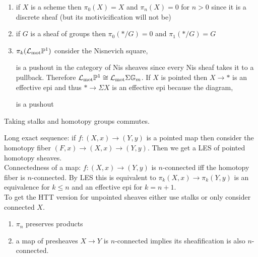 \documentclass[12pt]{article}
\begin{document}
\begin{example}
\begin{enumerate}
\item if $X$ is a scheme then $\pi_0(X) = X$ and $\pi_n(X) = 0$ for $n > 0$ since it is a discrete sheaf (but its motivicification will not be)
\item if $G$ is a sheaf of groups then $\pi_0(*/G) = 0$ and $\pi_1(*/G) = G$
\item $\pi_k(\mathcal{L}_{\text{mot}} \mathbb{P}^1)$ consider the Nisnevich square,
\begin{center}
\end{center}
is a pushout in the category of Nis sheaves since every Nis sheaf takes it to a pullback. Therefore $\mathcal{L}_{\text{mot}} \mathbb{P}^1 \cong \mathcal{L}_{\text{mot}} \Sigma \mathbb{G}_m$. If $X$ is pointed then $X \to *$ is an effective epi and thus $* \to \Sigma X$ is an effective epi because the diagram,
\begin{center}
\end{center}
is a pushout
\end{enumerate}
\end{example}

\begin{rmk}
Taking stalks and homotopy groups commutes. 
\end{rmk}


Long exact sequence: if $f : (X, x) \to (Y, y)$ is a pointed map then consider the homotopy fiber $(F, x) \to (X, x) \to (Y, y)$. Then we get a LES of pointed homotopy sheaves.
\bigskip\\
Connectedness of a map: $f : (X, x) \to (Y, y)$ is $n$-connected iff the homotopy fiber is $n$-connected. By LES this is equivalent to $\pi_k(X, x) \to \pi_k(Y, y)$ is an equivalence for $k \le n$ and an effective epi for $k = n +1$. 
\bigskip\\
To get the HTT version for unpointed sheaves either use stalks or only consider connected $X$. 

\begin{prop}
\begin{enumerate}
\item $\pi_n$ preserves products
\item a map of presheaves $X \to Y$ is $n$-connected implies its sheafification is also $n$-connected. 
\end{enumerate}
\end{prop}
\end{document}
